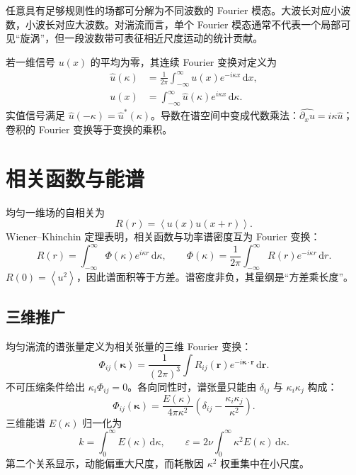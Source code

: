 \documentclass[12pt,a4paper,openany,fontset=none]{ctexbook}
\newcommand{\dd}{\,\mathrm d}
\newcommand{\avg}[1]{\left\langle #1\right\rangle}
\begin{document}
任意具有足够规则性的场都可分解为不同波数的 Fourier 模态。大波长对应小波数，小波长对应大波数。对湍流而言，单个 Fourier 模态通常不代表一个局部可见“旋涡”，但一段波数带可表征相近尺度运动的统计贡献。

若一维信号 $u(x)$ 的平均为零，其连续 Fourier 变换对定义为
\begin{align}
 \widehat u(\kappa)&=\frac{1}{2\pi}\int_{-\infty}^{\infty}u(x)e^{-i\kappa x}\dd x,\\
 u(x)&=\int_{-\infty}^{\infty}\widehat u(\kappa)e^{i\kappa x}\dd\kappa.
\end{align}
实值信号满足 $\widehat u(-\kappa)=\widehat u^*(\kappa)$。导数在谱空间中变成代数乘法：$\widehat{\partial_xu}=i\kappa\widehat u$；卷积的 Fourier 变换等于变换的乘积。

\section{相关函数与能谱}

均匀一维场的自相关为
\begin{equation}
 R(r)=\avg{u(x)u(x+r)}.
\end{equation}
Wiener--Khinchin 定理表明，相关函数与功率谱密度互为 Fourier 变换：
\begin{equation}
 R(r)=\int_{-\infty}^{\infty}\Phi(\kappa)e^{i\kappa r}\dd\kappa,
 \qquad
 \Phi(\kappa)=\frac{1}{2\pi}\int_{-\infty}^{\infty}R(r)e^{-i\kappa r}\dd r.
\end{equation}
$R(0)=\avg{u^2}$，因此谱面积等于方差。谱密度非负，其量纲是“方差乘长度”。

\subsection{三维推广}

均匀湍流的谱张量定义为相关张量的三维 Fourier 变换：
\begin{equation}
 \Phi_{ij}(\bm\kappa)=\frac{1}{(2\pi)^3}\int R_{ij}(\bm r)
 e^{-i\bm\kappa\cdot\bm r}\dd\bm r.
\end{equation}
不可压缩条件给出 $\kappa_i\Phi_{ij}=0$。各向同性时，谱张量只能由 $\delta_{ij}$ 与 $\kappa_i\kappa_j$ 构成：
\begin{equation}
 \Phi_{ij}(\bm\kappa)=\frac{E(\kappa)}{4\pi\kappa^2}
 \left(\delta_{ij}-\frac{\kappa_i\kappa_j}{\kappa^2}\right).
\end{equation}
三维能谱 $E(\kappa)$ 归一化为
\begin{equation}
 k=\int_0^\infty E(\kappa)\dd\kappa,
 \qquad
 \varepsilon=2\nu\int_0^\infty \kappa^2E(\kappa)\dd\kappa.
\end{equation}
第二个关系显示，动能偏重大尺度，而耗散因 $\kappa^2$ 权重集中在小尺度。
\end{document}
